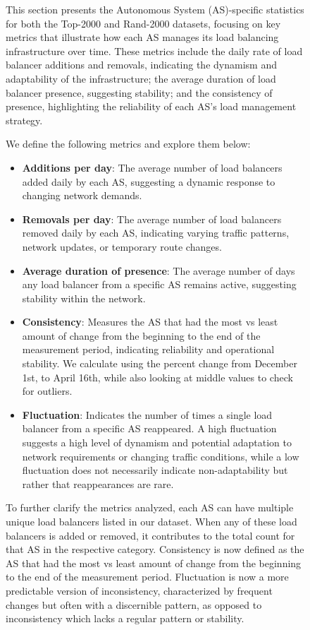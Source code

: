 \documentclass[12pt]{cwru_thesis}
\begin{document}
\begin{figure}[h!]
This section presents the Autonomous System (AS)-specific statistics for both the Top-2000 and Rand-2000 datasets, focusing on key metrics that illustrate how each AS manages its load balancing infrastructure over time. These metrics include the daily rate of load balancer additions and removals, indicating the dynamism and adaptability of the infrastructure; the average duration of load balancer presence, suggesting stability; and the consistency of presence, highlighting the reliability of each AS's load management strategy.

We define the following metrics and explore them below:
\begin{itemize}
    \item \textbf{Additions per day}: The average number of load balancers added daily by each AS, suggesting a dynamic response to changing network demands.
    \item \textbf{Removals per day}: The average number of load balancers removed daily by each AS, indicating varying traffic patterns, network updates, or temporary route changes.
    \item \textbf{Average duration of presence}: The average number of days any load balancer from a specific AS remains active, suggesting stability within the network.
    \item \textbf{Consistency}: Measures the AS that had the most vs least amount of change from the beginning to the end of the measurement period, indicating reliability and operational stability. We calculate using the percent change from December 1st, to April 16th, while also looking at middle values to check for outliers. 
    
    \item \textbf{Fluctuation}: Indicates the number of times a single load balancer from a specific AS reappeared. A high fluctuation suggests a high level of dynamism and potential adaptation to network requirements or changing traffic conditions, while a low fluctuation does not necessarily indicate non-adaptability but rather that reappearances are rare.
\end{itemize}


To further clarify the metrics analyzed, each AS can have multiple unique load balancers listed in our dataset. When any of these load balancers is added or removed, it contributes to the total count for that AS in the respective category. Consistency is now defined as the AS that had the most vs least amount of change from the beginning to the end of the measurement period. Fluctuation is now a more predictable version of inconsistency, characterized by frequent changes but often with a discernible pattern, as opposed to inconsistency which lacks a regular pattern or stability.


\end{figure}
\end{document}
